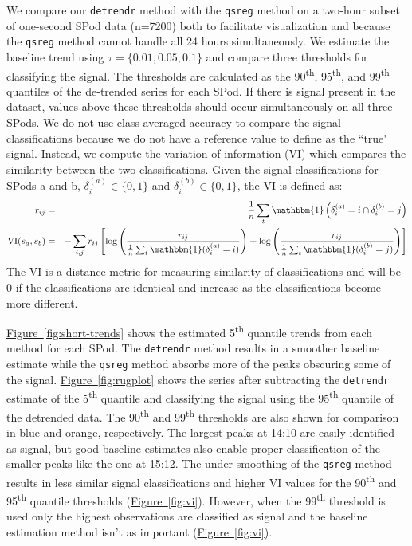 \documentclass[aoas]{imsart}
\newcommand{\Fig}[1]{\hyperref[fig:#1]{Figure~\ref*{fig:#1}}} %
\newcommand{\Fig}[1]{{Figure~\ref{fig:#1}}} %
\newcommand{\VI}{\text{VI}}
\newcommand{\One}{\mathbbm{1}}
\begin{document}
We compare our \texttt{detrendr} method with the \texttt{qsreg} method on a two-hour subset of one-second  SPod data (n=7200) both to facilitate visualization and because the \texttt{qsreg} method cannot handle all 24 hours simultaneously. We estimate the baseline trend using $\tau = \{0.01, 0.05, 0.1\}$ and compare three thresholds for classifying the signal. The thresholds are calculated as the 90\textsuperscript{th}, 95\textsuperscript{th}, and 99\textsuperscript{th} quantiles of the de-trended series for each SPod. If there is signal present in the dataset, values above these thresholds should occur simultaneously on all three SPods. We do not use class-averaged accuracy to compare the signal classifications because we do not have a reference value to define as the ``true" signal. Instead, we compute the variation of information (VI) which compares the similarity between the two classifications. Given the signal classifications for SPods a and b, $\delta^{(a)}_i \in \{0,1\}$ and $\delta^{(b)}_i\in\{0,1\}$, the VI is defined as:
\begin{eqnarray*}
	r_{ij} & = & \frac{1}{n}\sum_t \One\left(\delta^{(a)}_i = i  \cap \delta^{(b)}_i = j\right)\\
	\VI(s_a, s_b) & = & -\sum_{i,j} r_{ij} \left[ \log \left(\frac{r_{ij}}{\frac{1}{n}\sum_t \One(\delta^{(a)}_i = i)}\right) +
	\log \left(\frac{r_{ij}}{\frac{1}{n}\sum_t \One(\delta^{(b)}_i = j)}\right) \right]
\end{eqnarray*}
The $\VI$ is a distance metric for measuring similarity of classifications and will be 0 if the classifications are identical and increase as the classifications become more different.  


\Fig{short-trends} shows the estimated 5\textsuperscript{th} quantile trends from each method for each SPod. The \texttt{detrendr} method results in a smoother baseline estimate while the \texttt{qsreg} method absorbs more of the peaks obscuring some of the signal.  \Fig{rugplot} shows the series after subtracting the \texttt{detrendr} estimate of the 5\textsuperscript{th} quantile and classifying the signal using the 95\textsuperscript{th} quantile of the detrended data. The 90\textsuperscript{th} and 99\textsuperscript{th} thresholds are also shown for comparison in blue and orange, respectively. The largest peaks at 14:10 are easily identified as signal, but good baseline estimates also enable proper classification of the smaller peaks like the one at 15:12. The under-smoothing of the \texttt{qsreg} method results in less similar signal classifications and higher VI values for the 90\textsuperscript{th} and 95\textsuperscript{th} quantile thresholds (\Fig{vi}). However, when the 99\textsuperscript{th} threshold is used only the highest observations are classified as signal and the baseline estimation method isn't as important (\Fig{vi}).  
\end{document}
